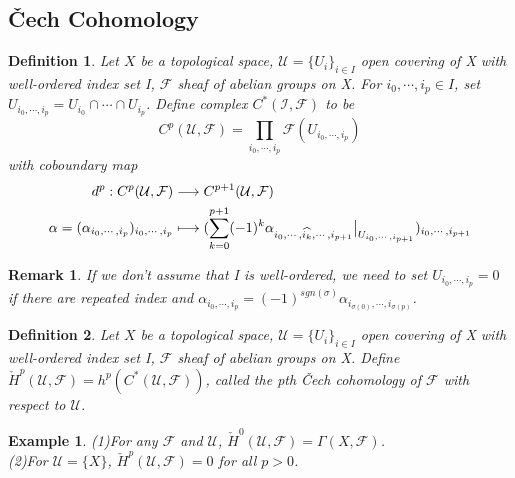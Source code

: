 \documentclass{ctexart}
\newtheorem{definition}{Definition}[section]
\newtheorem{remark}{Remark}[section]
\newtheorem{example}{Example}[section]
\begin{document}
\subsection{Čech Cohomology}
\begin{definition}
    Let $X$ be a topological space, $\mathcal{U} = \{U_{i}\}_{i\in I}$ open covering of X with well-ordered index set I, $\mathcal{F}$ sheaf of abelian groups on X.
    For $i_{0}, \cdots, i_{p}\in I$, set $U_{i_{0}, \cdots, i_{p}} = U_{i_{0}} \cap \cdots \cap U_{i_{p}}$.
    Define complex $C^{\ast}(\mathcal{I}, \mathcal{F})$ to be 
    \begin{equation*}
        C^{p}(\mathcal{U}, \mathcal{F}) = \prod_{i_{0}, \cdots, i_{p}} \mathcal{F}(U_{i_{0}, \cdots, i_{p}})
    \end{equation*}
    with coboundary map 
    \begin{equation*}
        \begin{split}
            d^{p}: C^{p}(\mathcal{U}, \mathcal{F}) & \longrightarrow C^{p + 1}(\mathcal{U}, \mathcal{F}) \\
            \alpha = (\alpha_{i_{0}, \cdots, i_{p}})_{i_{0}, \cdots, i_{p}} & \longmapsto (\sum_{k = 0}^{p + 1} (-1)^{k}\alpha_{i_{0}, \cdots, \widehat{i_{k}}, \cdots, i_{p + 1}}\big{|}_{U_{i_{0}, \cdots, i_{p + 1}}})_{i_{0}, \cdots, i_{p + 1}}
        \end{split}
    \end{equation*}
\end{definition}
\begin{remark}
    If we don't assume that I is well-ordered, we need to set $U_{i_{0}, \cdots, i_{p}} = 0$ if there are repeated index and $\alpha_{i_{0}, \cdots, i_{p}} = (-1)^{sgn(\sigma)}\alpha_{i_{\sigma(0)}, \cdots, i_{\sigma(p)}}$.
\end{remark}
\begin{definition}
    Let $X$ be a topological space, $\mathcal{U} = \{U_{i}\}_{i\in I}$ open covering of X with well-ordered index set I, $\mathcal{F}$ sheaf of abelian groups on X.
    Define $\check{H}^{p}(\mathcal{U}, \mathcal{F}) = h^{p}(C^{\ast}(\mathcal{U}, \mathcal{F}))$, called the pth Čech cohomology of $\mathcal{F}$ with respect to $\mathcal{U}$.
\end{definition}
\begin{example}
    (1)For any $\mathcal{F}$ and $\mathcal{U}$, $\check{H}^{0}(\mathcal{U}, \mathcal{F}) = \Gamma(X, \mathcal{F})$. \\
    (2)For $\mathcal{U} = \{X\}$, $\check{H}^{p}(\mathcal{U}, \mathcal{F}) = 0$ for all $p > 0$.
\end{example}
\end{document}
